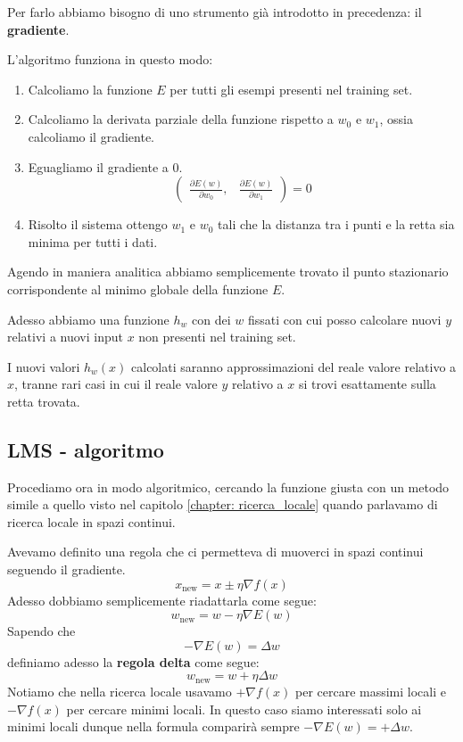 Per farlo abbiamo bisogno di uno strumento gi\`a introdotto in precedenza: il \textbf{gradiente}.

L'algoritmo funziona in questo modo:
\begin{enumerate}
	\item Calcoliamo la funzione $E$ per tutti gli esempi presenti nel training set.
	\item Calcoliamo la derivata parziale della funzione rispetto a $w_0$ e $w_1$, ossia calcoliamo il gradiente.
	\item Eguagliamo il gradiente a 0.
	      \[
		      \begin{pmatrix}
			      \displaystyle\frac{ \partial E(w) }{ \partial w_0 }, &
			      \displaystyle\frac{ \partial E(w) }{ \partial w_1 }
		      \end{pmatrix} = 0
	      \]
	\item Risolto il sistema ottengo $w_1$ e $w_0$ tali che la distanza tra i punti e la retta sia minima per tutti i dati.
\end{enumerate}

Agendo in maniera analitica abbiamo semplicemente trovato il punto stazionario corrispondente al minimo globale della
funzione $E$.

Adesso abbiamo una funzione $h_w$ con dei $w$ fissati con cui posso calcolare nuovi $y$ relativi a nuovi
input $x$ non presenti nel training set.

I nuovi valori $h_w(x)$ calcolati saranno approssimazioni del reale valore relativo a $x$, tranne rari casi
in cui il reale valore $y$ relativo a $x$ si trovi esattamente sulla retta trovata.

\subsection{LMS - algoritmo}
Procediamo ora in modo algoritmico, cercando la funzione giusta con un metodo simile a quello visto nel capitolo
\ref{chapter: ricerca_locale} quando parlavamo di ricerca locale in spazi continui.

Avevamo definito una regola che ci permetteva di muoverci in spazi continui seguendo il gradiente.
\[ x_{\text{new}} = x \pm \eta \nabla f(x) \]
Adesso dobbiamo semplicemente riadattarla come segue:
\[ w_{\text{new}} = w - \eta \nabla E(w) \]
Sapendo che
\[ -\nabla E(w) = \Delta w \]
definiamo adesso la \textbf{regola delta} come segue:
\[ w_{\text{new}} = w + \eta \Delta w \]
Notiamo che nella ricerca locale usavamo $+\nabla f(x)$ per cercare massimi locali e $-\nabla f(x)$ per cercare minimi
locali. In questo caso siamo interessati solo ai minimi locali dunque nella formula comparir\`a sempre
$-\nabla E(w) = +\Delta w$.

